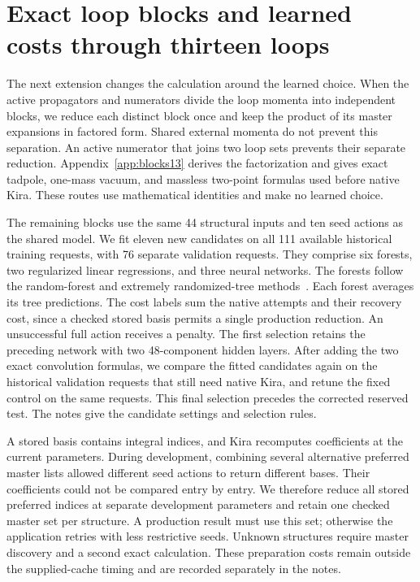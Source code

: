 \section{Exact loop blocks and learned costs through thirteen loops}
\label{sec:blocks13}
The next extension changes the calculation around the learned choice. When the active propagators and numerators divide the loop momenta into independent blocks, we reduce each distinct block once and keep the product of its master expansions in factored form. Shared external momenta do not prevent this separation. An active numerator that joins two loop sets prevents their separate reduction. Appendix~\ref{app:blocks13} derives the factorization and gives exact tadpole, one-mass vacuum, and massless two-point formulas used before native Kira. These routes use mathematical identities and make no learned choice.

The remaining blocks use the same 44 structural inputs and ten seed actions as the shared model. We fit eleven new candidates on all 111 available historical training requests, with 76 separate validation requests. They comprise six forests, two regularized linear regressions, and three neural networks. The forests follow the random-forest and extremely randomized-tree methods~\cite{Breiman2001Forest,Geurts2006ExtraTrees}. Each forest averages its tree predictions. The cost labels sum the native attempts and their recovery cost, since a checked stored basis permits a single production reduction. An unsuccessful full action receives a penalty. The first selection retains the preceding network with two 48-component hidden layers. After adding the two exact convolution formulas, we compare the fitted candidates again on the historical validation requests that still need native Kira, and retune the fixed control on the same requests. This final selection precedes the corrected reserved test. The notes give the candidate settings and selection rules.

A stored basis contains integral indices, and Kira recomputes coefficients at the current parameters. During development, combining several alternative preferred master lists allowed different seed actions to return different bases. Their coefficients could not be compared entry by entry. We therefore reduce all stored preferred indices at separate development parameters and retain one checked master set per structure. A production result must use this set; otherwise the application retries with less restrictive seeds. Unknown structures require master discovery and a second exact calculation. These preparation costs remain outside the supplied-cache timing and are recorded separately in the notes.

